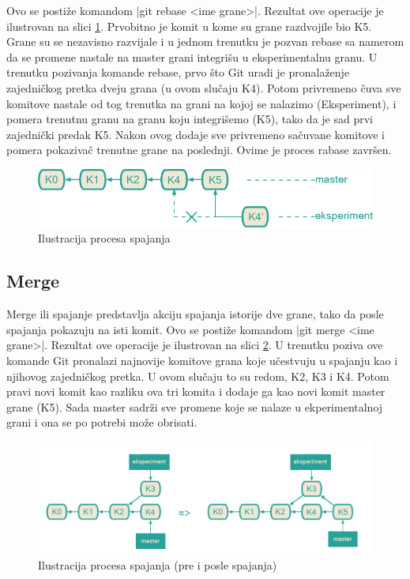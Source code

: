 \documentclass[a4paper]{article}
\begin{document}
{Ovo se postiže komandom |git rebase <ime grane>|. Rezultat ove operacije je ilustrovan na slici \ref{fig:rebase}. Prvobitno je komit u kome su grane razdvojile bio K5. Grane su se nezavisno razvijale i u jednom trenutku je pozvan rebase sa namerom da se promene nastale na master grani integrišu u eksperimentalnu granu. U trenutku pozivanja komande rebase, prvo što Git uradi je pronalaženje zajedničkog pretka dveju grana (u ovom slučaju K4). Potom privremeno čuva sve komitove nastale od tog trenutka na grani na kojoj se nalazimo (Eksperiment), i pomera trenutnu granu na granu koju integrišemo (K5), tako da je sad prvi zajednički predak K5. Nakon ovog dodaje sve privremeno sačuvane komitove i pomera pokazivač trenutne grane na poslednji. Ovime je proces rabase završen.
\begin{figure}[h!]
\begin{center}
\includegraphics[scale=0.3]{images/rebase.png}
\end{center}
\caption{Ilustracija procesa spajanja}
\label{fig:rebase}
\end{figure}

\subsection{Merge}
\label{subsec:merge}
Merge ili spajanje predstavlja akciju spajanja istorije dve grane, tako da posle spajanja pokazuju na isti komit. Ovo se postiže komandom |git merge <ime grane>|. Rezultat ove operacije je ilustrovan na slici \ref{fig:merge}. U trenutku poziva ove komande Git pronalazi najnovije komitove grana koje učestvuju u spajanju kao i njihovog zajedničkog pretka. U ovom slučaju to su redom, K2, K3 i K4. Potom pravi novi komit kao razliku ova tri komita i dodaje ga kao novi komit master grane (K5). Sada master sadrži sve promene koje se nalaze u ekperimentalnoj grani i ona se po potrebi može obrisati.
\begin{figure}[h!]
\begin{center}
\includegraphics[scale=0.3]{images/merge.png}
\end{center}
\caption{Ilustracija procesa spajanja (pre i posle spajanja)}
\label{fig:merge}
\end{figure}

}
\end{document}
